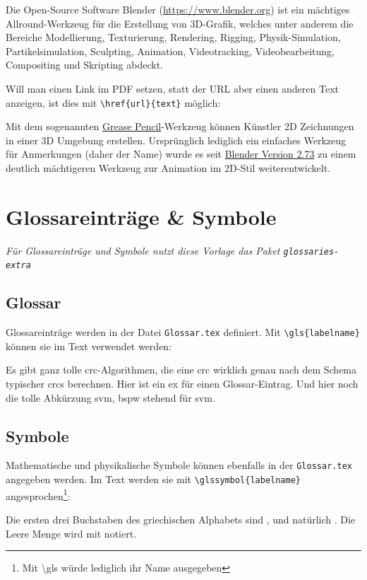 		\begin{vorlagenbeispiel}
			Die Open-Source Software Blender (\url{https://www.blender.org}) ist ein mächtiges Allround-Werkzeug für die Erstellung von 3D-Grafik, welches unter anderem die Bereiche Modellierung, Texturierung, Rendering, Rigging, Physik-Simulation, Partikelsimulation, Sculpting, Animation, Videotracking, Videobearbeitung, Compositing und Skripting abdeckt.
		\end{vorlagenbeispiel}
		\medskip

		Will man einen Link im PDF setzen, statt der URL aber einen anderen Text anzeigen, ist dies mit \lstinline[language=thesis-latexbeispiel]|\href{url}{text}| möglich:
%		
		\begin{vorlagenbeispiel}
			Mit dem sogenannten \href{https://www.blender.org/features/grease-pencil/}{Grease Pencil}-Werkzeug können Künstler 2D Zeichnungen in einer 3D Umgebung erstellen.
			Ursprünglich lediglich ein einfaches Werkzeug für Anmerkungen (daher der Name) wurde es seit \href{https://www.blender.org/download/releases/2-73/}{Blender Version 2.73} zu einem deutlich mächtigeren Werkzeug zur Animation im 2D-Stil weiterentwickelt.
		\end{vorlagenbeispiel}		
		
	\section{Glossareinträge \& Symbole}
		\emph{Für Glossareinträge und Symbole nutzt diese Vorlage das Paket \lstinline|glossaries-extra|}
		\medskip
		
		\subsection{Glossar}
			Glossareinträge werden in der Datei \lstinline|Glossar.tex| definiert. Mit \lstinline[language=thesis-latexbeispiel]|\gls{labelname}| können sie im Text verwendet werden:
%			
			\begin{vorlagenbeispiel}
				Es gibt ganz tolle \gls{crc}-Algorithmen, die eine \gls{crc} wirklich genau nach dem Schema typischer \glspl{crc} berechnen.
				Hier ist ein \gls{ex} für einen Glossar-Eintrag. 
				Und hier noch die tolle Abkürzung \gls{svm}, \gls{bspw} stehend für \gls{svm}.
			\end{vorlagenbeispiel}
		\subsection{Symbole}
			Mathematische und physikalische Symbole können ebenfalls in der \lstinline|Glossar.tex| angegeben werden.
			Im Text werden sie mit \lstinline[language=thesis-latexbeispiel]|\glssymbol{labelname}| angesprochen\footnote{Mit \textbackslash gls würde lediglich ihr Name ausgegeben}:
%			
			\begin{vorlagenbeispiel}
				Die ersten drei Buchstaben des griechischen Alphabets sind ,  und natürlich . Die Leere Menge wird mit  notiert.
			\end{vorlagenbeispiel}
			
